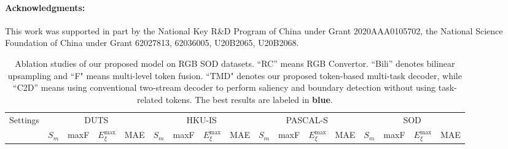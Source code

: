 \documentclass[10pt,twocolumn,letterpaper]{article}
\def\blu#1{\textbf{\color{blue} #1}} \def\red#1{\textbf{\color{red}\underline{#1}}}
\begin{document}
\vspace{-4mm}
\paragraph{Acknowledgments:}
This work was supported in part by the National Key R\&D Program of China under Grant 2020AAA0105702, the National Science Foundation of China under Grant 62027813, 62036005, U20B2065, U20B2068.


{\small


}

\clearpage

\begin{table*}[!ht]
\centering
\footnotesize
\renewcommand{\arraystretch}{1.1}
\renewcommand{\tabcolsep}{1.3mm}
\caption{Ablation studies of our proposed model on RGB SOD datasets. ``RC'' means RGB Convertor.  ``Bili'' denotes bilinear upsampling and ``F" means multi-level token fusion. ``TMD" denotes our proposed token-based multi-task decoder, while ``C2D'' means using conventional two-stream decoder to perform saliency and boundary detection without using task-related tokens. The best results are labeled in \blu{blue}.
}
\begin{tabular}{l|l|cccc|cccc|cccc|cccc}
\hline
\multicolumn{2}{l|}{\multirow{2}{*}{Settings}} & \multicolumn{4}{c|}{DUTS \cite{wang2017duts}} & \multicolumn{4}{c|}{HKU-IS \cite{li2015HKUIS}} & \multicolumn{4}{c|}{PASCAL-S \cite{li2014PASCALS}} & \multicolumn{4}{c}{SOD \cite{movahedi2010SOD}}\\
\multicolumn{2}{l|}{} & \multicolumn{1}{l}{$S_m$} & \multicolumn{1}{l}{maxF} & \multicolumn{1}{l}{$E_{\xi}^{\text{max}}$} & \multicolumn{1}{l|}{MAE}
                      & \multicolumn{1}{l}{$S_m$} & \multicolumn{1}{l}{maxF} & \multicolumn{1}{l}{$E_{\xi}^{\text{max}}$} & \multicolumn{1}{l|}{MAE}
                      & \multicolumn{1}{l}{$S_m$} & \multicolumn{1}{l}{maxF} & \multicolumn{1}{l}{$E_{\xi}^{\text{max}}$} & \multicolumn{1}{l|}{MAE}
                      & \multicolumn{1}{l}{$S_m$} & \multicolumn{1}{l}{maxF} & \multicolumn{1}{l}{$E_{\xi}^{\text{max}}$} & \multicolumn{1}{l}{MAE}

  \\ \hline


\end{tabular}
\end{table*}
\end{document}
